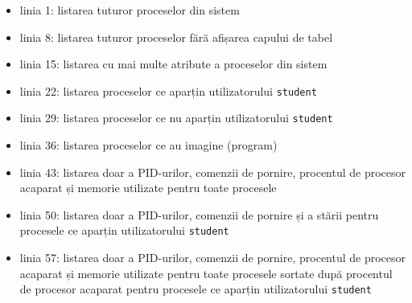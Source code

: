 \begin{itemize}
  \item linia 1: listarea tuturor proceselor din sistem
  \item linia 8: listarea tuturor proceselor fără afișarea capului de tabel
  \item linia 15: listarea cu mai multe atribute a proceselor din sistem
  \item linia 22: listarea proceselor ce aparțin utilizatorului \texttt{student}
  \item linia 29: listarea proceselor ce nu aparțin utilizatorului \texttt{student}
  \item linia 36: listarea proceselor ce au imagine (program) 
  \item linia 43: listarea doar a PID-urilor, comenzii de pornire, procentul de procesor acaparat și memorie utilizate pentru toate procesele
  \item linia 50: listarea doar a PID-urilor, comenzii de pornire și a stării pentru procesele ce aparțin utilizatorului \texttt{student}
  \item linia 57: listarea doar a PID-urilor, comenzii de pornire, procentul de procesor acaparat și memorie utilizate pentru toate procesele sortate după procentul de procesor acaparat pentru procesele ce aparțin utilizatorului \texttt{student}
\end{itemize}

